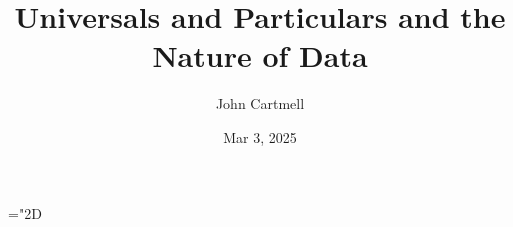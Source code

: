 
\usepackage{mathptmx}
\usepackage{amsfonts}
\usepackage{wasysym}
\usepackage{url}
\usepackage{hyperref}

\newcommand{\sharedmacros}{../../../SharedMacros}













\renewcommand{\erpictureFolder}[0]{../../../SharedPictures}
\setcounter{equation}{0}

\makeatletter
\newcommand{\xRightarrow}[2][]{\ext@arrow 0359\Rightarrowfill@{#1}{#2}}
\makeatother


\title[John Cartmell]{Universals and Particulars and the Nature of Data}


\author{John Cartmell}
\institute{\\}
\date{Mar 3, 2025}

\usepackage{framed}
\usepackage{bibentry}
\usepackage{colortbl}
\usepackage{ulem}   %
\usepackage{soul,xcolor} %

\usepackage{listings}
\usepackage{arydshln} %
\usepackage{pst-arrow} %





\newcommand{\fgsourcediag}{$\binarysourcediag{a}{b}{c}{f}{g}$}
\newcommand{\rangeplus}{RR.5 range } %
\newcommand{\datacat}{$\gamma$-structured category}
\newcommand{\datacatw}{\datacat\ }
\mathchardef\localjchyphen="2D
\newtheorem{construction}[theorem]{Construction}

\newcommand{\IfSforGammaCwithRCwords}{
If $S$ is a sketch for \datacatw \catcw considered as a data specification with requirement $\reqtc$\ }
\newcommand{\IfSforGammaCwithRCwordsvariant}{
If $S$ is a sketch for \datacatw  \catcw and if $S$ is considered as a data specification with requirement $\reqtc$\ }



